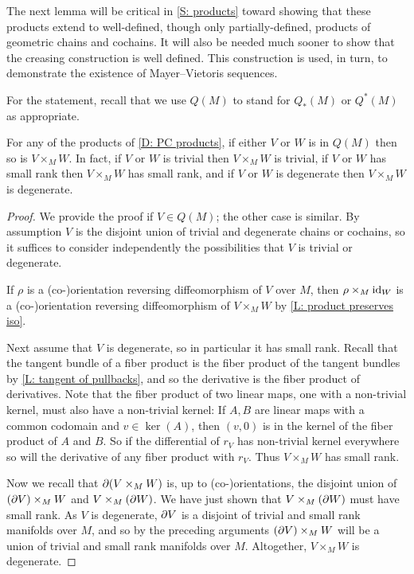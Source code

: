 The next lemma will be critical in \cref{S: products} toward showing that these products extend to well-defined, though only partially-defined, products of geometric chains and cochains.
It will also be needed much sooner to show that the creasing construction is well defined.
This construction is used, in turn, to demonstrate the existence of Mayer--Vietoris sequences.

For the statement, recall that we use $Q(M)$ to stand for $Q_*(M)$ or $Q^*(M)$ as appropriate.

\begin{lemma}\label{L: pullback with Q}
	For any of the products of \cref{D: PC products}, if either $V$ or $W$ is in $Q(M)$ then so is $V \times_M W$.
	In fact, if $V$ or $W$ is trivial then $V \times_M W$ is trivial, if $V$ or $W$ has small rank then $V \times_M W$ has small rank, and if $V$ or $W$ is degenerate then $V \times_M W$ is degenerate.
\end{lemma}

\begin{proof}
	We provide the proof if $V \in Q(M)$; the other case is similar.
	By assumption $V$ is the disjoint union of trivial and degenerate chains or cochains, so it suffices to consider independently the possibilities that $V$ is trivial or degenerate.

	If $\rho$ is a (co\nobreakdash-)orientation reversing diffeomorphism of $V$ over $M$, then $\rho \times_M \mathrm{id}_W$ is a (co\nobreakdash-)orientation reversing diffeomorphism of $V \times_M W$ by \cref{L: product preserves iso}.

	Next assume that $V$ is degenerate, so in particular it has small rank.
	Recall that the tangent bundle of a fiber product is the fiber product of the tangent bundles by \cref{L: tangent of pullbacks}, and so the derivative is the fiber product of derivatives.
	Note that the fiber product of two linear maps, one with a non-trivial kernel, must also have a non-trivial kernel: If $A,B$ are linear maps with a common codomain and $v \in \ker(A)$, then $(v,0)$ is in the kernel of the fiber product of $A$ and $B$.
	So if the differential of $r_V$ has non-trivial kernel everywhere so will the derivative of any fiber product with $r_V$.
	Thus $V \times_M W$ has small rank.

	Now we recall that $\partial(V \times_M W)$ is, up to (co\nobreakdash-)orientations, the disjoint union of $(\partial V) \times_M W$ and $V \times_M (\partial W)$.
	We have just shown that $V \times_M (\partial W)$ must have small rank.
	As $V$ is degenerate, $\partial V$ is a disjoint of trivial and small rank manifolds over $M$, and so by the preceding arguments $(\partial V) \times_M W$ will be a union of trivial and small rank manifolds over $M$.
	Altogether, $V \times_M W$ is degenerate.
\end{proof}

